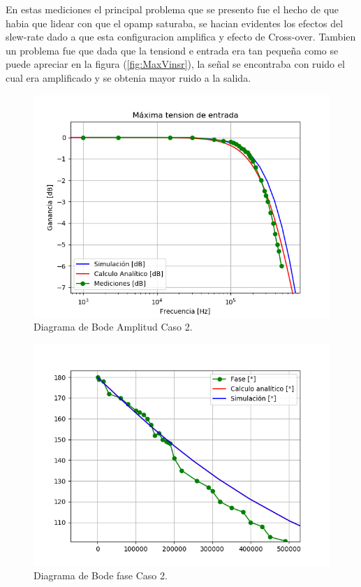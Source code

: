 En estas mediciones el principal problema que se presento fue el hecho de que habia que lidear con que el opamp saturaba, se hacian evidentes los efectos del slew-rate  dado a que esta configuracion amplifica y efecto de  Cross-over. Tambien un problema fue que dada que la tensiond e entrada era tan pequeña como se puede apreciar en la figura (\ref{fig:MaxVinsr}), la señal se encontraba con ruido el cual era amplificado y se obtenia mayor ruido a la salida.
\begin{figure}[H]	
	\centering
	\includegraphics[width=\textwidth]{Ejercicio1/Imagenes/BodeC2.png}
	\caption{Diagrama de Bode Amplitud Caso 2.}
	\label{fig:BodeC2}
\end{figure} 
\begin{figure}[H]	
	\centering
	\includegraphics[width=\textwidth]{Ejercicio1/Imagenes/BodephC2.png}
	\caption{Diagrama de Bode fase Caso 2.}
	\label{fig:BodephC2}
\end{figure} 
